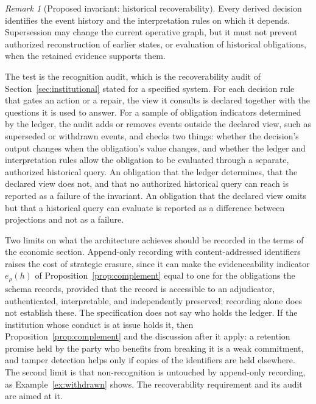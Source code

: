 \documentclass[11pt]{article}
\theoremstyle{definition}
\theoremstyle{remark}
\newtheorem{remark}{Remark}
\begin{document}
\begin{remark}[Proposed invariant: historical recoverability]
Every derived decision identifies the event history and the interpretation rules on which it depends. Supersession may change the current operative graph, but it must not prevent authorized reconstruction of earlier states, or evaluation of historical obligations, when the retained evidence supports them.
\end{remark}

The test is the recognition audit, which is the recoverability audit of Section~\ref{sec:institutional} stated for a specified system. For each decision rule that gates an action or a repair, the view it consults is declared together with the questions it is used to answer. For a sample of obligation indicators determined by the ledger, the audit adds or removes events outside the declared view, such as superseded or withdrawn events, and checks two things: whether the decision's output changes when the obligation's value changes, and whether the ledger and interpretation rules allow the obligation to be evaluated through a separate, authorized historical query. An obligation that the ledger determines, that the declared view does not, and that no authorized historical query can reach is reported as a failure of the invariant. An obligation that the declared view omits but that a historical query can evaluate is reported as a difference between projections and not as a failure.

Two limits on what the architecture achieves should be recorded in the terms of the economic section. Append-only recording with content-addressed identifiers raises the cost of strategic erasure, since it can make the evidenceability indicator $e_\rho(h)$ of Proposition~\ref{prop:complement} equal to one for the obligations the schema records, provided that the record is accessible to an adjudicator, authenticated, interpretable, and independently preserved; recording alone does not establish these. The specification does not say who holds the ledger. If the institution whose conduct is at issue holds it, then Proposition~\ref{prop:complement} and the discussion after it apply: a retention promise held by the party who benefits from breaking it is a weak commitment, and tamper detection helps only if copies of the identifiers are held elsewhere. The second limit is that non-recognition is untouched by append-only recording, as Example~\ref{ex:withdrawn} shows. The recoverability requirement and its audit are aimed at it.
\end{document}
